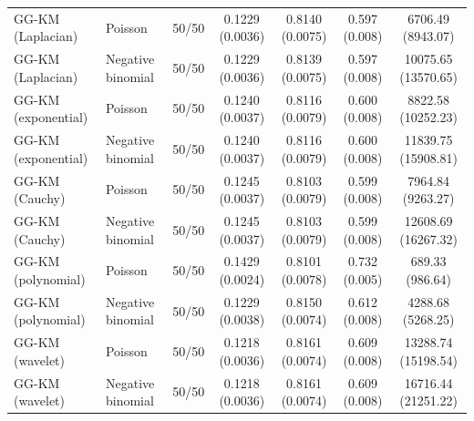 \begin{table}[tbp]
{\begin{tabular}{llccccc}
GG-KM (Laplacian)
& Poisson
& 50/50
& 0.1229 (0.0036)
& 0.8140 (0.0075)
& 0.597 (0.008)
& 6706.49 (8943.07) \\

GG-KM (Laplacian)
& Negative binomial
& 50/50
& 0.1229 (0.0036)
& 0.8139 (0.0075)
& 0.597 (0.008)
& 10075.65 (13570.65) \\

GG-KM (exponential)
& Poisson
& 50/50
& 0.1240 (0.0037)
& 0.8116 (0.0079)
& 0.600 (0.008)
& 8822.58 (10252.23) \\

GG-KM (exponential)
& Negative binomial
& 50/50
& 0.1240 (0.0037)
& 0.8116 (0.0079)
& 0.600 (0.008)
& 11839.75 (15908.81) \\

GG-KM (Cauchy)
& Poisson
& 50/50
& 0.1245 (0.0037)
& 0.8103 (0.0079)
& 0.599 (0.008)
& 7964.84 (9263.27) \\

GG-KM (Cauchy)
& Negative binomial
& 50/50
& 0.1245 (0.0037)
& 0.8103 (0.0079)
& 0.599 (0.008)
& 12608.69 (16267.32) \\

GG-KM (polynomial)
& Poisson
& 50/50
& 0.1429 (0.0024)
& 0.8101 (0.0078)
& 0.732 (0.005)
& 689.33 (986.64) \\

GG-KM (polynomial)
& Negative binomial
& 50/50
& 0.1229 (0.0038)
& 0.8150 (0.0074)
& 0.612 (0.008)
& 4288.68 (5268.25) \\

GG-KM (wavelet)
& Poisson
& 50/50
& 0.1218 (0.0036)
& 0.8161 (0.0074)
& 0.609 (0.008)
& 13288.74 (15198.54) \\

GG-KM (wavelet)
& Negative binomial
& 50/50
& 0.1218 (0.0036)
& 0.8161 (0.0074)
& 0.609 (0.008)
& 16716.44 (21251.22) \\

\hline
\end{tabular}
}
\end{table}
